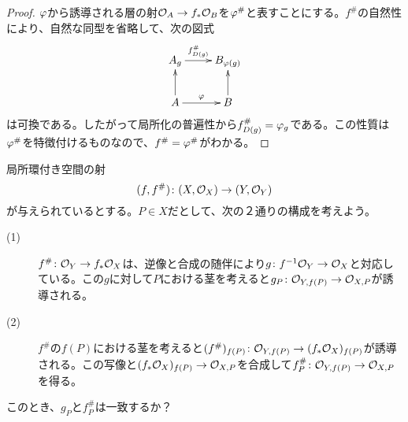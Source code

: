 \begin{proof}
  ${\varphi}$から誘導される層の射$\mathcal{O}_A \to f_*\mathcal{O}_B$を${\varphi}^{\#}$と表すことにする。$f^{\#}$の自然性により、自然な同型を省略して、次の図式
  \[
  \xymatrix{
  A_g \ar[r]^-{ f^{\#}_{D(g)} } & B_{\vp(g)} \\
  A \ar[u] \ar[r]^-{\vp} & B \ar[u]
  }
  \]
  は可換である。したがって局所化の普遍性から$f^{\#}_{D(g)} = {\varphi}_g$である。この性質は${\varphi}^{\#}$を特徴付けるものなので、$f^{\#} = {\varphi}^{\#}$がわかる。
\end{proof}


\begin{que}
  局所環付き空間の射
  \[
  (f,f^{\#}) \colon (X,\mathcal{O}_X) \to (Y,\mathcal{O}_Y)
  \]
  が与えられているとする。$P \in X$だとして、次の２通りの構成を考えよう。
  \begin{description}
    \item[(1)] $f^{\#} \colon \mathcal{O}_Y \to f_* \mathcal{O}_X$は、逆像と合成の随伴により$g \colon f^{-1}\mathcal{O}_Y \to \mathcal{O}_X$と対応している。この$g$に対して$P$における茎を考えると$g_P \colon \mathcal{O}_{Y,f(P)} \to \mathcal{O}_{X,P}$が誘導される。
    \item[(2)] $f^{\#}$の$f(P)$における茎を考えると$(f^{\#})_{f(P)} \colon \mathcal{O}_{Y,f(P)} \to (f_* \mathcal{O}_X)_{f(P)}$が誘導される。この写像と$(f_* \mathcal{O}_X)_{f(P)} \to \mathcal{O}_{X,P}$を合成して$f^{\#}_P \colon \mathcal{O}_{Y,f(P)} \to \mathcal{O}_{X,P}$を得る。
  \end{description}
  このとき、$g_P$と$f^{\#}_P$は一致するか？
\end{que}
